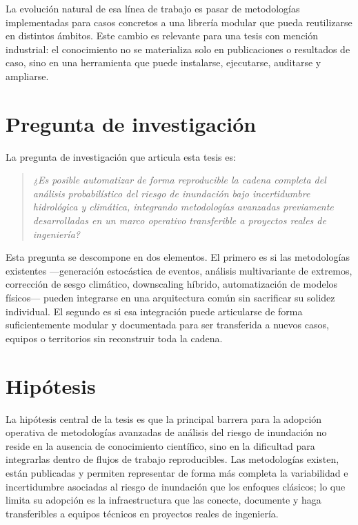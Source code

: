 La evolución natural de esa línea de trabajo es pasar de metodologías implementadas para casos concretos a una librería modular que pueda reutilizarse en distintos ámbitos. Este cambio es relevante para una tesis con mención industrial: el conocimiento no se materializa solo en publicaciones o resultados de caso, sino en una herramienta que puede instalarse, ejecutarse, auditarse y ampliarse.

\section{Pregunta de investigación}

La pregunta de investigación que articula esta tesis es:

\begin{quote}
\textit{¿Es posible automatizar de forma reproducible la cadena completa del análisis probabilístico del riesgo de inundación bajo incertidumbre hidrológica y climática, integrando metodologías avanzadas previamente desarrolladas en un marco operativo transferible a proyectos reales de ingeniería?}
\end{quote}

Esta pregunta se descompone en dos elementos. El primero es si las metodologías existentes ---generación estocástica de eventos, análisis multivariante de extremos, corrección de sesgo climático, downscaling híbrido, automatización de modelos físicos--- pueden integrarse en una arquitectura común sin sacrificar su solidez individual. El segundo es si esa integración puede articularse de forma suficientemente modular y documentada para ser transferida a nuevos casos, equipos o territorios sin reconstruir toda la cadena.

\section{Hipótesis}

La hipótesis central de la tesis es que la principal barrera para la adopción operativa de metodologías avanzadas de análisis del riesgo de inundación no reside en la ausencia de conocimiento científico, sino en la dificultad para integrarlas dentro de flujos de trabajo reproducibles. Las metodologías existen, están publicadas y permiten representar de forma más completa la variabilidad e incertidumbre asociadas al riesgo de inundación que los enfoques clásicos; lo que limita su adopción es la infraestructura que las conecte, documente y haga transferibles a equipos técnicos en proyectos reales de ingeniería.

